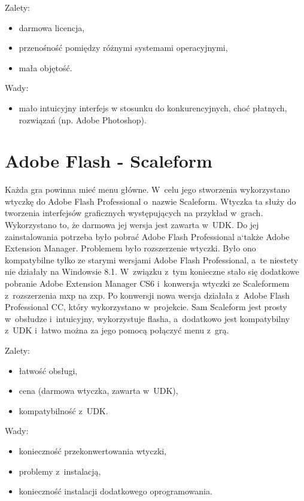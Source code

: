 {\raggedright
Zalety:
\begin{itemize}
\item darmowa licencja,
\item przenośność pomiędzy różnymi systemami operacyjnymi,
\item mała objętość.
\end{itemize}

Wady:
\begin{itemize}
\item mało intuicyjny interfejs w stosunku do konkurencyjnych, choć płatnych, rozwiązań (np. Adobe Photoshop).
\end{itemize}
}

\section{Adobe Flash - Scaleform}

Każda gra powinna mieć menu główne. W~celu jego stworzenia wykorzystano wtyczkę do Adobe Flash Professional o~nazwie Scaleform. Wtyczka ta służy do tworzenia interfejsów graficznych występujących na przykład w~grach. Wykorzystano to, że darmowa jej wersja jest zawarta w~UDK. Do jej zainstalowania potrzeba było pobrać Adobe Flash Professional a`także Adobe Extension Manager. Problemem było rozszerzenie wtyczki. Było ono kompatybilne tylko ze starymi wersjami Adobe Flash Professional, a~te niestety nie działały na Windowsie 8.1. W~związku z~tym konieczne stało się dodatkowe pobranie 
Adobe Extension Manager CS6 i~konwersja wtyczki ze Scaleformem z~rozszerzenia mxp na zxp.
Po konwersji nowa wersja działała z~Adobe Flash Professional CC, który wykorzystano w~projekcie. Sam Scaleform jest prosty w~obsłudze i~intuicyjny, wykorzystuje flasha, a~dodatkowo jest kompatybilny z~UDK i~łatwo można za jego pomocą połączyć menu z~grą.

{\raggedright Zalety:
\begin{itemize}
\item łatwość obsługi,
\item cena (darmowa wtyczka, zawarta w~UDK),
\item kompatybilność z~UDK.
\end{itemize}

Wady:
\begin{itemize}
\item konieczność przekonwertowania wtyczki,
\item problemy z~instalacją,
\item konieczność instalacji dodatkowego oprogramowania.
\end{itemize}
}

